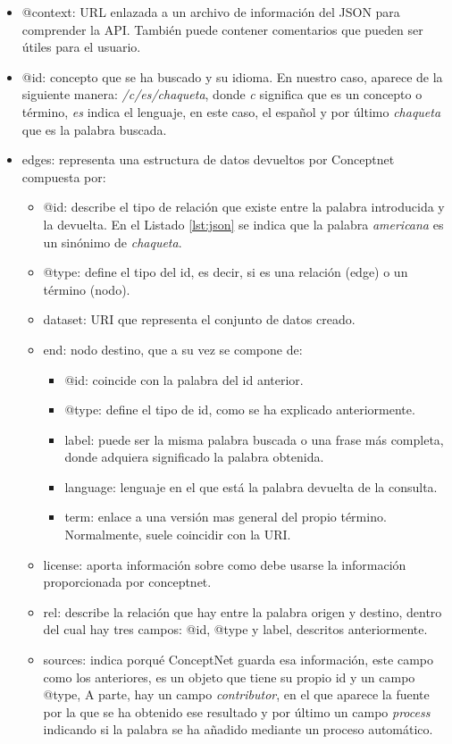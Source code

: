 \begin{itemize}
	\item @context: URL enlazada a un archivo de información del JSON para comprender la API. También puede contener comentarios que pueden ser útiles para el usuario.
	\item @id: concepto que se ha buscado y su idioma. En nuestro caso, aparece de la siguiente manera: \textit{/c/es/chaqueta}, donde  \textit{c} significa que es un concepto o término,  \textit{es} indica el lenguaje, en este caso, el español y por último \textit{chaqueta} que es la palabra buscada.
	\item edges: representa una estructura de datos devueltos por Conceptnet compuesta por:
	\begin{itemize}
		\item @id: describe el tipo de relación que existe entre la palabra introducida y la devuelta. En el Listado \ref{lst:json} se indica que la palabra \textit{americana} es un sinónimo de \textit{chaqueta}.
		\item @type: define el tipo del id, es decir, si es una relación (edge) o un término (nodo).
		\item dataset: URI que representa el conjunto de datos creado.
		\item end: nodo destino, que a su vez se compone de:	
		\begin{itemize}
			\item @id: coincide con la palabra del id anterior.
			\item @type: define el tipo de id, como se ha explicado anteriormente.
			\item label: puede ser la misma palabra buscada o una frase más completa, donde adquiera significado la palabra obtenida.
			\item language: lenguaje en el que está la palabra devuelta de la consulta.
			\item term: enlace a una versión mas general del propio término. Normalmente, suele coincidir con la URI.			
		\end{itemize}
		\item license: aporta información sobre como debe usarse la información proporcionada por conceptnet.
		\item rel: describe la relación que hay entre la palabra origen y destino, dentro del cual hay tres campos: @id, @type y label, descritos anteriormente.
		\item sources: indica porqué ConceptNet guarda esa información, este campo como los anteriores, es un objeto que tiene su propio id y un campo @type, A parte, hay un campo \textit{contributor}, en el que aparece la fuente por la que se ha obtenido ese resultado y por último un campo \textit{process} indicando si la palabra se ha añadido mediante un proceso automático.

\end{itemize}
\end{itemize}
